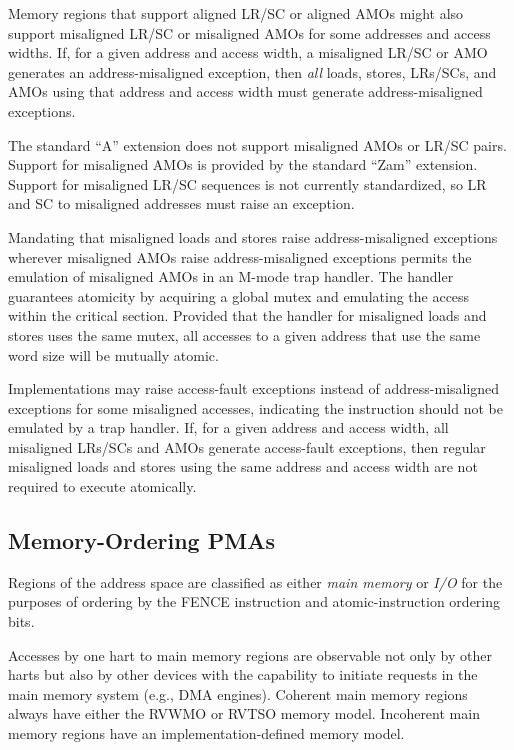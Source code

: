 Memory regions that support aligned LR/SC or aligned AMOs might also support
misaligned LR/SC or misaligned AMOs for some addresses and access widths.  If,
for a given address and access width, a misaligned LR/SC or AMO generates
an address-misaligned exception, then {\em all} loads, stores, LRs/SCs, and
AMOs using that address and access width must generate address-misaligned
exceptions.
\begin{commentary}
The standard ``A'' extension does not support misaligned AMOs or LR/SC pairs.
Support for misaligned AMOs is provided by the standard ``Zam'' extension.
Support for misaligned LR/SC sequences is not currently standardized,
so LR and SC to misaligned addresses must raise an exception.

Mandating that misaligned loads and stores raise address-misaligned exceptions
wherever misaligned AMOs raise address-misaligned exceptions permits the
emulation of misaligned AMOs in an M-mode trap handler.  The handler
guarantees atomicity by acquiring a global mutex and emulating the access
within the critical section.  Provided that the handler for misaligned loads
and stores uses the same mutex, all accesses to a given address that use the
same word size will be mutually atomic.
\end{commentary}

Implementations may raise access-fault exceptions instead of address-misaligned
exceptions for some misaligned accesses, indicating the instruction should not
be emulated by a trap handler.  If, for a given address and access width, all
misaligned LRs/SCs and AMOs generate access-fault exceptions, then regular
misaligned loads and stores using the same address and access width are not
required to execute atomically.

\subsection{Memory-Ordering PMAs}

Regions of the address space are classified as either {\em main
  memory} or {\em I/O} for the purposes of ordering by the FENCE
instruction and atomic-instruction ordering bits.

Accesses by one hart to main memory regions are observable not only by
other harts but also by other devices with the capability to initiate
requests in the main memory system (e.g., DMA engines).
Coherent main memory regions always have either the RVWMO or RVTSO memory
model.
Incoherent main memory regions have an implementation-defined memory model.

